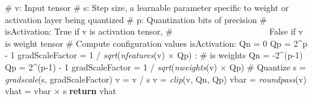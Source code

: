 \documentclass{article}
\begin{document}
\begin{algorithm}
   \caption{quantize(v, s, p, isActivation):}
   \label{alg:quantize}
\begin{algorithmic}
   \STATE \# v: Input tensor
   \STATE \# s: Step size, a learnable parameter specific to weight or activation layer being quantized
   \STATE \# p: Quantization bits of precision
   \STATE \# isActivation: True if v is activation tensor, 
   \STATE \# \ \ \ \ \ \ \ \ \ \ \ \ \ \ \ \ \ \ \ \ \ \  False if v is weight tensor
   \STATE 
   \STATE \# Compute configuration values   
    isActivation:
   \STATE\hspace{\algorithmicindent} Qn = 0
   \STATE\hspace{\algorithmicindent} Qp = 2\^{}p - 1 %
   \STATE\hspace{\algorithmicindent} gradScaleFactor = 1 / \textit{sqrt}(\textit{nfeatures}(v) $\times$ Qp)   
   : \# is weights
   \STATE\hspace{\algorithmicindent} Qn = -2\^{}(p-1)%
   \STATE\hspace{\algorithmicindent} Qp = 2\^{}(p-1) - 1 %
   \STATE\hspace{\algorithmicindent} gradScaleFactor = 1 / \textit{sqrt}(\textit{nweights}(v) $\times$ Qp)   
   \STATE
   \STATE \# Quantize
   \STATE s = \textit{gradscale}(s, gradScaleFactor)
   \STATE v = v / s
   \STATE v = \textit{clip}(v, Qn, Qp)
   \STATE vbar = \textit{roundpass}(v)
   \STATE vhat = vbar $\times$ s
   \STATE\textbf{return} vhat
\end{algorithmic}
\end{algorithm}
\end{document}
